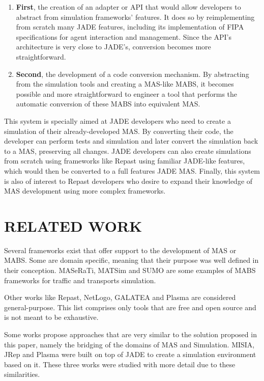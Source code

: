 \documentclass[a4paper,twoside]{article}
\begin{document}
\begin{enumerate}
  \item \textbf{First}, the creation of an adapter or API that would allow developers to abstract from simulation frameworks' features. It does so by reimplementing from scratch many JADE features, including its implementation of FIPA specifications for agent interaction and management. Since the API's architecture is very close to JADE's, conversion becomes more straightforward.
  \item \textbf{Second}, the development of a code conversion mechanism. By abstracting from the simulation tools and creating a MAS-like MABS, it becomes possible and more straightforward to engineer a tool that performs the automatic conversion of these MABS into equivalent MAS.
\end{enumerate}

This system is specially aimed at JADE developers who need to create a simulation of their already-developed MAS. By converting their code, the developer can perform tests and simulation and later convert the simulation back to a MAS, preserving all changes. JADE developers can also create simulations from scratch using frameworks like Repast using familiar JADE-like features, which would then be converted to a full features JADE MAS. Finally, this system is also of interest to Repast developers who desire to expand their knowledge of MAS development using more complex frameworks.


\section{\uppercase{Related Work}}
\label{sec:Background}
\noindent Several frameworks exist that offer support to the development of MAS or MABS. Some are domain specific, meaning that their purpose was well defined in their conception. MASeRaTi\cite{ahlbrecht2014scalable}, MATSim\cite{balmer2008agent} and SUMO\cite{SUMO2012} are some examples of MABS frameworks for traffic and transports simulation. 

Other works like Repast\cite{collier2003repast}, NetLogo\cite{tisue2004netlogo}, GALATEA\cite{davila2000galatea} and Plasma \cite{warden2010towards} are considered general-purpose. This list comprises only tools that are free and open source and is not meant to be exhaustive.

Some works propose approaches that are very similar to the solution proposed in this paper, namely the bridging of the domains of MAS and Simulation. MISIA, JRep and Plasma were built on top of JADE to create a simulation environment based on it. These three works were studied with more detail due to these similarities.
\end{document}

